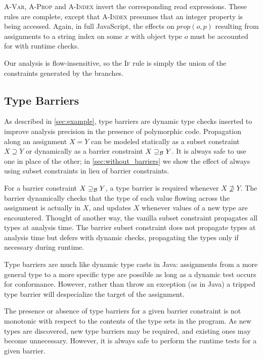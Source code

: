 \textsc{A-Var}, \textsc{A-Prop} and \textsc{A-Index} invert the
corresponding read expressions.  These rules are complete, except that
\textsc{A-Index} presumes that an integer property is being accessed.
Again, in full JavaScript, the effects on $\mathit{prop}(o,p)$ resulting from
assignments to a string index  on some $x$ with object type $o$
must be accounted for with runtime checks.

Our analysis is flow-insensitive, so the \textsc{If} rule is simply the union
of the constraints generated by the branches.

\subsection{Type Barriers}
\label{sec:analysis-barriers}

As described in \Section\ref{sec:example}, type barriers are dynamic type checks
inserted to improve analysis precision in the presence
of polymorphic code.
Propagation along an assignment $X = Y$ can be modeled
statically as a subset
constraint $X \supseteq Y$ or dynamically as a barrier constraint
$X \supseteq_\mathcal{B} Y$.
It is always safe to use one in place of the other; in \Section\ref{sec:without_barriers}
we show the effect of always using subset constraints in lieu of
barrier constraints.

For a barrier constraint $X \supseteq_\mathcal{B} Y$, a type barrier is required whenever
$X \not\supseteq Y$. The barrier dynamically checks that the type of each value
flowing across the assignment is actually in $X$, and updates $X$ whenever
values of a new type are encountered.
Thought of another way, the vanilla subset constraint propagates
all types at analysis time. The barrier subset constraint does not propagate
types at analysis time but defers with dynamic checks, propagating the types
only if necessary during runtime.

Type barriers are much like dynamic type casts in Java: assignments from a
more general type to a more specific type are possible as long as a
dynamic test occurs for conformance.
However, rather than throw an exception (as in Java) a tripped type barrier will
despecialize the target of the assignment.

The presence or absence of type barriers for a given barrier constraint is not
monotonic with respect to the contents of the type sets in the program.  As
new types are discovered, new type barriers may be required, and existing ones
may become unnecessary.  However, it is always safe to perform the runtime
tests for a given barrier.


